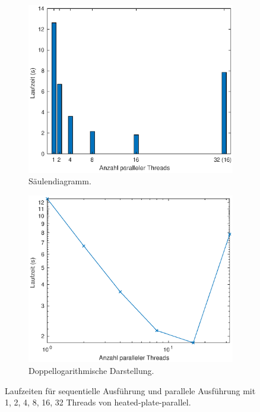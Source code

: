 \begin{figure}[htbp]
 \centering 
 \begin{subfigure}{.49\textwidth}
  \centering 
  \includegraphics[width=1\textwidth]{img/aufgabe5_barplot.eps}
  \caption{Säulendiagramm.}
  \label{fig:aufgabe5_barplot}
 \end{subfigure}
%
 \begin{subfigure}{.49\textwidth}
  \centering 
  \includegraphics[width=1\textwidth]{img/aufgabe5_logplot.eps}
  \caption{Doppellogarithmische Darstellung.}
  \label{fig:aufgabe5_logplot}
 \end{subfigure}
\caption{Laufzeiten für sequentielle Ausführung und parallele Ausführung mit 1, 2, 4, 8, 16, 32 Threads von heated-plate-parallel.}
\label{fig:aufgabe5}
\end{figure}

